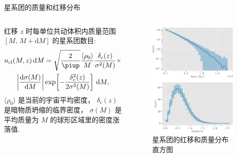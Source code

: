 \documentclass{beamer}
\newcommand{\R}[1]{\text{#1}}  %
\newcommand{\Cpi}{\piup}  %
\newcommand{\D}[1]{\R{d}#1}
\newcommand{\diff}[2]{\frac{\D{#1}}{\D{#2}}}
\begin{document}
\begin{frame}{星系团的质量和红移分布}
  \begin{columns}
    红移 $z$ 时每单位共动体积内质量范围 $[M,\, M+\D{M}]$ 的星系团数目:
    \begin{multline}
      n_{\R{cl}}(M,z) \,\D{M} =
        \sqrt{\frac{2}{\Cpi}} \frac{\langle \rho_0 \rangle}{M}
        \frac{\delta_c(z)}{\sigma^2(M)} \times \\
        \left| \diff{\sigma(M)}{M} \right|
        \exp\!\left[ -\frac{\delta_c^2(z)}{2\sigma^2(M)} \right]
        \,\D{M} ,
    \end{multline}
    $\langle \rho_0 \rangle$ 是当前的宇宙平均密度，
    $\delta_c(z)$ 是暗物质坍缩的临界密度，
    $\sigma(M)$ 是平均质量为 $M$ 的球形区域里的密度涨落值.

    \begin{figure}
      \centering
      \includegraphics[width=\columnwidth]{mass-z-dist}
      \caption{星系团的红移和质量分布直方图}
    \end{figure}
  \end{columns}
\end{frame}
\end{document}
